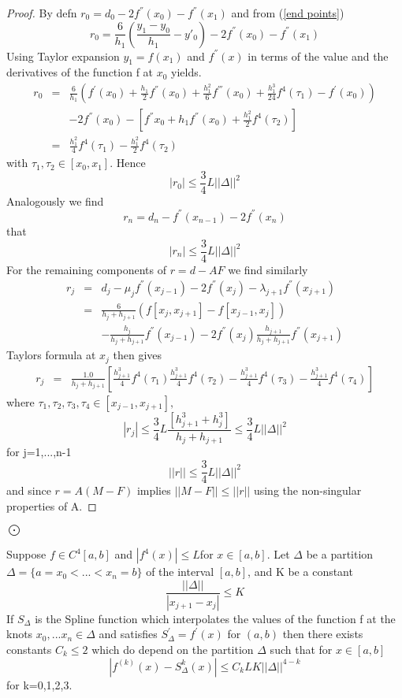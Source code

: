 \begin{proof}
By defn $r_0=d_0-2f^{''}(x_0)-f^{''}(x_1)$ and from (\ref{end points})
\[
r_0 = \frac{6}{h_1}\left(\frac{y_1-y_0}{h_1} - y'_0\right) -2f^{''}(x_0) - f^{''}(x_1) \]
Using Taylor expansion $y_1=f(x_1)$ and $f^{''}(x)$ in terms of the value and the derivatives of the function f at $x_0$ yields.
\begin{eqnarray*}
r_0&=& \frac{6}{h_1}(f^{'}(x_0)+\frac{h_{1}}{2}f^{''}(x_0)+\frac{h_1^2}{6}f^{'''}(x_0) + \frac{h_{1}^3}{24}f^{4}(\tau_1)-f^{'}(x_0) )\\
& & -2f^{''}(x_0) - [f^{''}x_0+h_1f^{''}(x_0)+\frac{h_1^2}{2}f^{4}(\tau_2)]\\
&=& \frac{h_1^2}{4}f^{4}(\tau_1) - \frac{h_{1}^2}{2}f^{4}(\tau_2)
\end{eqnarray*}
with $\tau_1,\tau_2 \in [x_0,x_1]$. Hence
\[ |r_0| \leq \frac{3}{4} L ||\Delta||^2 \]
Analogously we find
\[
r_n = d_n - f^{''}(x_{n-1})-2f^{''}(x_n) \]
that 
\[ |r_n| \leq \frac{3}{4} L ||\Delta||^2 \]
For the remaining components of $r=d-AF$ we find similarly
\begin{eqnarray*}
r_j&=&d_j - \mu_jf^{''}(x_{j-1})-2f^{''}(x_j) -\lambda_{j+1}f^{''}(x_{j+1})\\
&=&\frac{6}{h_j+h_{j+1}}\left(f[x_{j},x_{j+1}]-f[x_{j-1},x_{j}]\right)\\ & & -
\frac{h_{j}}{h_{j}+h_{j+1}}f^{''}(x_{j-1}) - 2f^{''}(x_j)
\frac{h_{j+1}}{h_{j}+h_{j+1}}f^{''}(x_{j+1}) 
\end{eqnarray*}
Taylors formula at $x_j$ then gives
\begin{eqnarray*}
r_j & =& \frac{1.0}{h_j+h_{j+1}}\left[ \frac{h_{j+1}^3}{4}f^{4}(\tau_1 )  \frac{h_{j+1}^3}{4}f^{4}(\tau_2 )  -\frac{h_{j+1}^3}{4}f^{4}(\tau_3 )  -\frac{h_{j+1}^3}{4}f^{4}(\tau_4 ) \right]
\end{eqnarray*}
where $\tau_1, \tau_2, \tau_3,\tau_4 \in [x_{j-1},x_{j+1}],$
\[ |r_j| \leq \frac{3}{4}L \frac{[h_{j+1}^3+h_j^3]}{h_j+h_{j+1}}\leq \frac{3}{4}L||\Delta||^2 \]
for j=1,...,n-1
\[
||r|| \leq \frac{3}{4} L || \Delta ||^2 \]
and since $r=A(M-F)$ implies $||M-F|| \leq ||r||$ using the non-singular properties of A.
\end{proof} $\bigodot$
\begin{theorem}
Suppose 
$f \in C^{4}[a,b]$ and $ |f^{4}(x)| \leq L $for $x \in [a,b]$. Let $\Delta$ be a partition
$\Delta = \{ a=x_0 < ... < x_n = b \} $ of the interval $[a,b]$, and K be a constant
\[
\frac{||\Delta||}{|x_{j+1}-x_{j}|} \leq K
\]
If $S_{\Delta}$ is the Spline function which interpolates the values of the function f at the knots $x_0,...x_n \in \Delta$
and satisfies $S^{'}_{\Delta} = f^{'}(x)$ for $(a,b) $ then there exists constants $C_{k} \leq 2$ which do depend on the partition $\Delta$ such that for $ x \in [a,b]$
\[
|f^{(k)}(x)-S_{\Delta}^{k}(x)|\leq C_{k}LK||\Delta||^{4-k} \]
for k=0,1,2,3.
\end{theorem}
